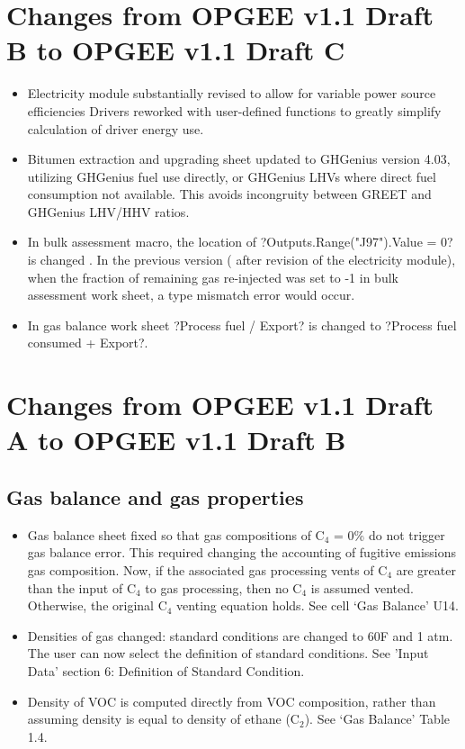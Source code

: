 \documentclass[11pt]{report}
\begin{document}
{{{{%
\section{Changes from OPGEE v1.1 Draft B to OPGEE v1.1 Draft C}
\begin{itemize}
\item Electricity module substantially revised to allow for variable power source efficiencies
Drivers reworked with user-defined functions to greatly simplify calculation of driver energy use.
\item Bitumen extraction and upgrading sheet updated to GHGenius version 4.03, utilizing GHGenius fuel use directly, or GHGenius LHVs where direct fuel consumption not available. This avoids incongruity between GREET and GHGenius LHV/HHV ratios.
\item In bulk assessment macro, the location of ?Outputs.Range("J97").Value = 0? is changed . In the previous version ( after revision of the electricity module), when the fraction of remaining gas re-injected was set to -1 in bulk assessment work sheet, a type mismatch error would occur.
\item In gas balance work sheet ?Process fuel / Export? is changed to ?Process fuel consumed + Export?.
\end{itemize}




\section{Changes from OPGEE v1.1 Draft A to OPGEE v1.1 Draft B}

\subsection{Gas balance and gas properties} 

\begin{itemize}
\item Gas balance sheet fixed so that gas compositions of C$_4$ = 0\% do not trigger gas balance error. This required changing the accounting of fugitive emissions gas composition. Now, if the associated gas processing vents of C$_4$ are greater than the input of C$_4$ to gas processing, then no C$_4$ is assumed vented. Otherwise, the original C$_4$ venting equation holds. See cell `Gas Balance' U14. 
\item Densities of gas changed: standard conditions are changed to 60F and 1 atm. The user can now select the definition of standard conditions. See 'Input Data' section 6: Definition of Standard Condition. 
\item Density of VOC is computed directly from VOC composition, rather than assuming density is equal to density of ethane (C$_2$). See `Gas Balance' Table 1.4.
\end{itemize}

}}}}
\end{document}
